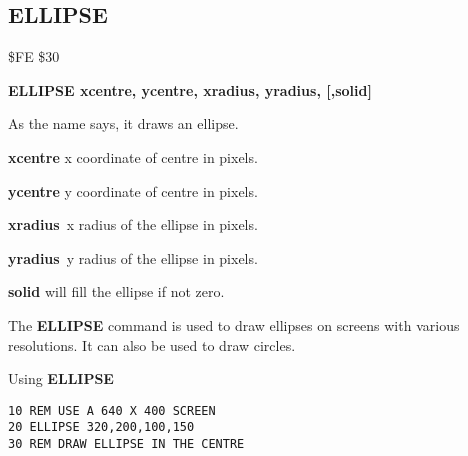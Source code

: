 \newpage
\subsection{ELLIPSE}
\begin{description}[leftmargin=2cm,style=nextline]
\item [Token:] \$FE \$30
\item [Format:] {\bf ELLIPSE xcentre, ycentre,
                xradius, yradius, [,solid]}
\item [Usage:] As the name says, it draws an ellipse.

               {\bf xcentre} x coordinate of centre in pixels.

               {\bf ycentre} y coordinate of centre in pixels.

               {\bf xradius} x radius of the ellipse in pixels.

               {\bf yradius} y radius of the ellipse in pixels.

               {\bf solid} will fill the ellipse if not zero.

\item [Remarks:] The {\bf ELLIPSE} command is used to draw ellipses on
               screens with various resolutions.
               It can also be used to draw circles.

\item [Example:] Using {\bf ELLIPSE}
\begin{tcolorbox}[colback=black,coltext=white]
\verbatimfont{\codefont}
\begin{verbatim}
10 REM USE A 640 X 400 SCREEN
20 ELLIPSE 320,200,100,150
30 REM DRAW ELLIPSE IN THE CENTRE
\end{verbatim}
\end{tcolorbox}
\end{description}


\newpage
